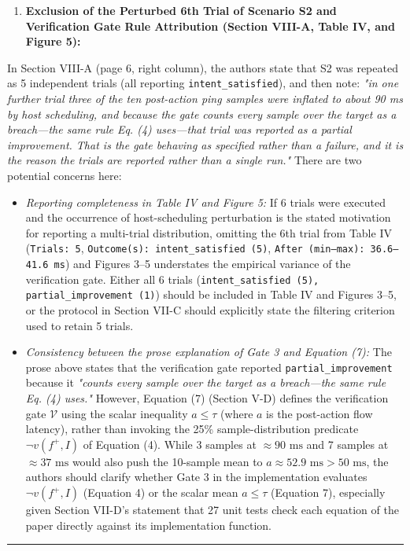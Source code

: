 \documentclass[11pt,a4paper]{article}
\begin{document}
\begin{enumerate}[leftmargin=1.6em,itemsep=3pt]
\item \textbf{Exclusion of the Perturbed 6th Trial of Scenario S2 and Verification Gate Rule Attribution (Section VIII-A, Table IV, and Figure 5):}
\end{enumerate}
In Section VIII-A (page 6, right column), the authors state that S2 was repeated as 5 independent trials (all reporting \texttt{intent\_satisfied}), and then note: \emph{"in one further trial three of the ten post-action ping samples were inflated to about 90 ms by host scheduling, and because the gate counts every sample over the target as a breach—the same rule Eq. (4) uses—that trial was reported as a partial improvement. That is the gate behaving as specified rather than a failure, and it is the reason the trials are reported rather than a single run."} There are two potential concerns here:
\begin{itemize}[leftmargin=1.8em,itemsep=2pt]
\item \emph{Reporting completeness in Table IV and Figure 5:} If 6 trials were executed and the occurrence of host-scheduling perturbation is the stated motivation for reporting a multi-trial distribution, omitting the 6th trial from Table IV (\texttt{Trials: 5}, \texttt{Outcome(s): intent\_satisfied (5)}, \texttt{After (min–max): 36.6–41.6 ms}) and Figures 3–5 understates the empirical variance of the verification gate. Either all 6 trials (\texttt{intent\_satisfied (5), partial\_improvement (1)}) should be included in Table IV and Figures 3–5, or the protocol in Section VII-C should explicitly state the filtering criterion used to retain 5 trials.
\item \emph{Consistency between the prose explanation of Gate 3 and Equation (7):} The prose above states that the verification gate reported \texttt{partial\_improvement} because it \emph{"counts every sample over the target as a breach—the same rule Eq. (4) uses."} However, Equation (7) (Section V-D) defines the verification gate $\mathcal{V}$ using the scalar inequality $a \le \tau$ (where $a$ is the post-action flow latency), rather than invoking the 25\% sample-distribution predicate $\neg v(f^+, I)$ of Equation (4). While 3 samples at $\approx 90\text{ ms}$ and 7 samples at $\approx 37\text{ ms}$ would also push the 10-sample mean to $a \approx 52.9\text{ ms} > 50\text{ ms}$, the authors should clarify whether Gate 3 in the implementation evaluates $\neg v(f^+, I)$ (Equation 4) or the scalar mean $a \le \tau$ (Equation 7), especially given Section VII-D's statement that 27 unit tests check each equation of the paper directly against its implementation function.
\end{itemize}
\par\medskip\noindent\rule{\linewidth}{0.4pt}\medskip\par
\end{document}
